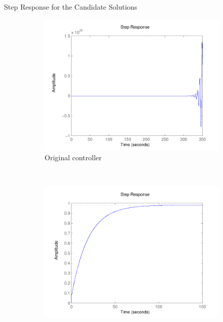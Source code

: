 \documentclass{beamer}
\begin{document}
%
%
\begin{frame}[fragile]{Step Response for the Candidate Solutions}
\begin{figure}
    \centering
    \begin{subfigure}[b]{0.3\textwidth}
        \includegraphics[width=\textwidth]{figures/runningexample_step0.pdf}
        \caption{Original controller}
        \label{fig:step0}
    \end{subfigure}
    ~
    \begin{subfigure}[b]{0.3\textwidth}
        \includegraphics[width=\textwidth]{figures/runningexample_step1.pdf}

\end{subfigure}
\end{figure}
\end{frame}
\end{document}
